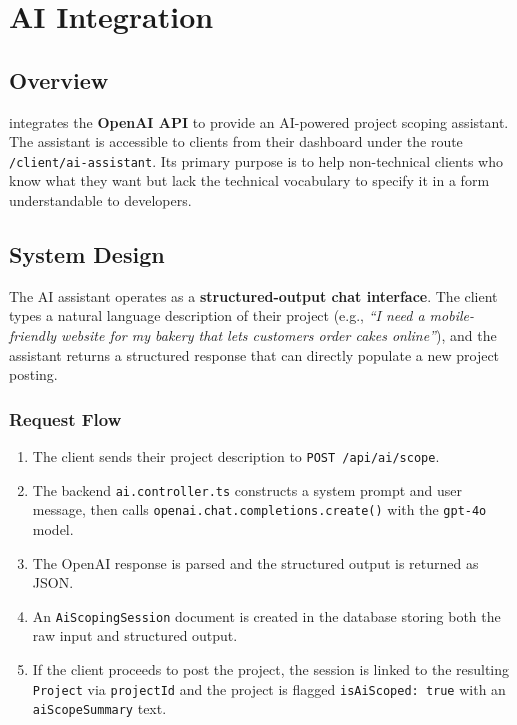 \chapter{AI Integration}

\section{Overview}

\projectname{} integrates the \textbf{OpenAI API} \cite{openai2024} to provide an AI-powered project scoping assistant. The assistant is accessible to clients from their dashboard under the route \texttt{/client/ai-assistant}. Its primary purpose is to help non-technical clients who know what they want but lack the technical vocabulary to specify it in a form understandable to developers.

\section{System Design}

The AI assistant operates as a \textbf{structured-output chat interface}. The client types a natural language description of their project (e.g., \textit{``I need a mobile-friendly website for my bakery that lets customers order cakes online''}), and the assistant returns a structured response that can directly populate a new project posting.

\subsection{Request Flow}

\begin{enumerate}
  \item The client sends their project description to \texttt{POST /api/ai/scope}.
  \item The backend \texttt{ai.controller.ts} constructs a system prompt and user message, then calls \texttt{openai.chat.completions.create()} with the \texttt{gpt-4o} model.
  \item The OpenAI response is parsed and the structured output is returned as JSON.
  \item An \texttt{AiScopingSession} document is created in the database storing both the raw input and structured output.
  \item If the client proceeds to post the project, the session is linked to the resulting \texttt{Project} via \texttt{projectId} and the project is flagged \texttt{isAiScoped: true} with an \texttt{aiScopeSummary} text.
\end{enumerate}

